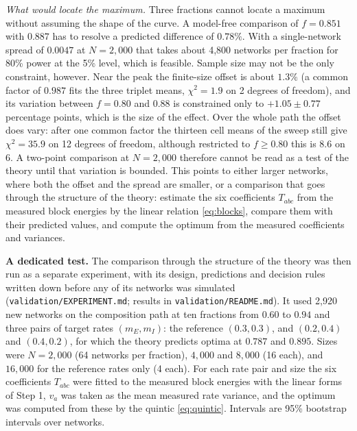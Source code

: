 \documentclass[11pt]{article}
\begin{document}
\emph{What would locate the maximum.} Three fractions cannot locate a maximum without assuming the shape of the curve. A model-free comparison of $f=0.851$ with $0.887$ has to resolve a predicted difference of $0.78\%$. With a single-network spread of $0.0047$ at $N=2{,}000$ that takes about 4{,}800 networks per fraction for 80\% power at the 5\% level, which is feasible. Sample size may not be the only constraint, however. Near the peak the finite-size offset is about $1.3\%$ (a common factor of $0.987$ fits the three triplet means, $\chi^2=1.9$ on 2 degrees of freedom), and its variation between $f=0.80$ and $0.88$ is constrained only to $+1.05\pm0.77$ percentage points, which is the size of the effect. Over the whole path the offset does vary: after one common factor the thirteen cell means of the sweep still give $\chi^2=35.9$ on 12 degrees of freedom, although restricted to $f\ge0.80$ this is $8.6$ on 6. A two-point comparison at $N=2{,}000$ therefore cannot be read as a test of the theory until that variation is bounded. This points to either larger networks, where both the offset and the spread are smaller, or a comparison that goes through the structure of the theory: estimate the six coefficients $T_{abc}$ from the measured block energies by the linear relation \eqref{eq:blocks}, compare them with their predicted values, and compute the optimum from the measured coefficients and variances.

\textbf{A dedicated test.} The comparison through the structure of the theory was then run as a separate experiment, with its design, predictions and decision rules written down before any of its networks was simulated (\texttt{validation/EXPERIMENT.md}; results in \texttt{validation/README.md}). It used 2{,}920 new networks on the composition path at ten fractions from $0.60$ to $0.94$ and three pairs of target rates $(m_E,m_I)$: the reference $(0.3,0.3)$, and $(0.2,0.4)$ and $(0.4,0.2)$, for which the theory predicts optima at $0.787$ and $0.895$. Sizes were $N=2{,}000$ (64 networks per fraction), $4{,}000$ and $8{,}000$ (16 each), and $16{,}000$ for the reference rates only (4 each). For each rate pair and size the six coefficients $T_{abc}$ were fitted to the measured block energies with the linear forms of Step 1, $v_a$ was taken as the mean measured rate variance, and the optimum was computed from these by the quintic \eqref{eq:quintic}. Intervals are 95\% bootstrap intervals over networks.
\end{document}
